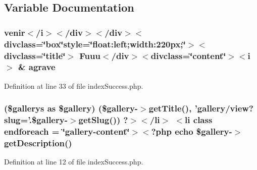 \subsection{Variable Documentation}
\hypertarget{live_2modules_2gallery_2templates_2index_success_8php_a184a65fae2dd681d3cfaff490e159465}{
\subsubsection[{agrave}]{\setlength{\rightskip}{0pt plus 5cm}venir$<$/{\bf i}$>$$<$/div$>$$<$/div$>$$<$divclass=\char`\"{}box\char`\"{}style=\char`\"{}float\-:left;width\-:220px;\char`\"{}$>$$<$divclass=\char`\"{}title\char`\"{}$>$ Fuuu$<$/div$>$$<$divclass=\char`\"{}content\char`\"{}$>$$<$i$>$ \& agrave}}\label{live_2modules_2gallery_2templates_2index_success_8php_a184a65fae2dd681d3cfaff490e159465}


Definition at line 33 of file index\-Success.\-php.

\hypertarget{live_2modules_2gallery_2templates_2index_success_8php_a1564a48b746a96e888ba07e118a7002c}{
\subsubsection[{endforeach}]{ (\$gallerys as \$gallery) (\$gallery-\/$>${\bf get\-Title}(), 'gallery/view?{\bf slug}='.\$gallery-\/$>$get\-Slug()) ?$>$$<$/li$>$ $<$li {\bf class} endforeach = \char`\"{}gallery-\/content\char`\"{}$>$$<$?php echo \$gallery-\/$>$get\-Description()}}\label{live_2modules_2gallery_2templates_2index_success_8php_a1564a48b746a96e888ba07e118a7002c}


Definition at line 12 of file index\-Success.\-php.

